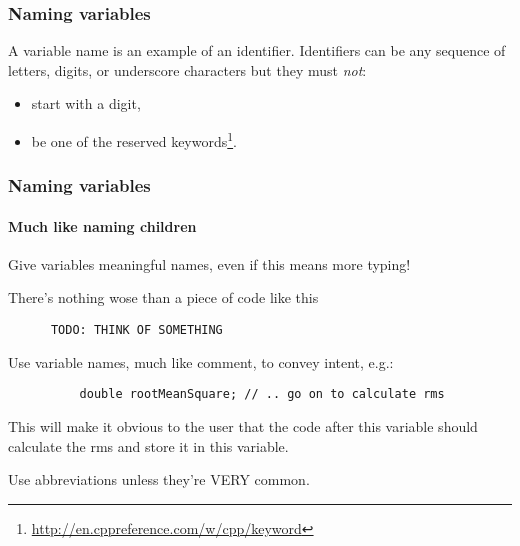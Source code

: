 \documentclass{beamer}
\begin{document}
\begin{frame}
  \frametitle{Naming variables}
  
  A variable name is an example of an identifier.
  Identifiers can be any sequence of letters, digits, or underscore characters but they must \emph{not}:
	\begin{itemize}
  	\item start with a digit,
	  \item be one of the reserved keywords\footnote{\href{http://en.cppreference.com/w/cpp/keyword}{\url{http://en.cppreference.com/w/cpp/keyword}}}.
	\end{itemize}
\end{frame}

\begin{frame}[fragile]
  \frametitle{Naming variables}
  \framesubtitle{Much like naming children}
  \begin{doblocke}
    \begin{doitemize}
      \item{
			Give variables meaningful names, even if this means more typing!
			
			There's nothing wose than a piece of code like this
			\begin{lstlisting}
	  TODO: THINK OF SOMETHING
			\end{lstlisting}
			}
		  \item{Use variable names, much like comment, to convey intent, e.g.:
		  \begin{lstlisting}
		  double rootMeanSquare; // .. go on to calculate rms
		  \end{lstlisting}}
		  This will make it obvious to the user that the code after this variable should calculate the rms and store it in this variable.
		\end{doitemize}
	\end{doblocke}
	\pause
	\begin{dontblocke}
	  Use abbreviations unless they're VERY common.
	\end{dontblocke}
\end{frame}
\end{document}
